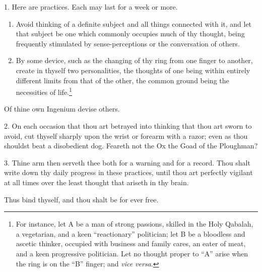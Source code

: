 1. Here are practices. Each may last for a week or more.

\begin{enumerate}[label=\greek*.]
\item Avoid thinking of a definite subject and all things connected with it, and let that subject be one which commonly occupies much of thy thought, being frequently stimulated by sense-perceptions or the conversation of others.

\item By some device, such as the changing of thy ring from one finger to another, create in thyself two personalities, the thoughts of one being within entirely different limits from that of the other, the common ground being the necessities of life.\footnote{For instance, let A be a man of strong passions, skilled in the Holy Qabalah, a vegetarian, and a keen \enquote{reactionary} politician; let B be a bloodless and ascetic thinker, occupied with business and family cares, an eater of meat, and a keen progressive politician. Let no thought proper to \enquote{A} arise when the ring is on the \enquote{B} finger; and \textit{vice versa}.}
\end{enumerate}

Of thine own Ingenium devise others.

2. On each occasion that thou art betrayed into thinking that thou art sworn to avoid, cut thyself sharply upon the wrist or forearm with a razor; even as thou shouldst beat a disobedient dog. Feareth not the Ox the Goad of the Ploughman?

3. Thine arm then serveth thee both for a warning and for a record. Thou shalt write down thy daily progress in these practices, until thou art perfectly vigilant at all times over the least thought that ariseth in thy brain.

Thus bind thyself, and thou shalt be for ever free.
